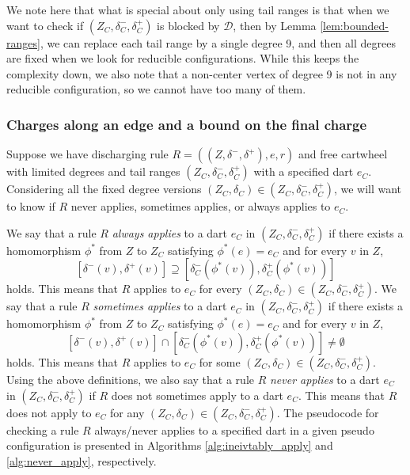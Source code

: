 \documentclass[10pt,a4paper]{article}
\def\cD{{\mathcal D}}
\newcommand\drop[1]{}
\begin{document}
We note here that what is special about only using tail ranges is that when we
want to check if  $(Z_C,\delta_C^-,\delta_C^+)$ is blocked by $\cD$, then by Lemma \ref{lem:bounded-ranges}, we can replace each tail range by a single degree 9, and then all degrees are fixed when we look for reducible configurations.
While this keeps the complexity down, we also note that a non-center vertex of degree 9 is not in any reducible configuration, so we cannot have too many of them.

\drop{Note that we can cut 
$(Z_C,\delta_C^-,\delta_C^+)$ from our output if we can guarantee that
no $(Z_C,\delta_C) \in (Z_C,\delta_C^-,\delta_C^+)$ is bad in the sense
of having non-negative final center charge and no centered reducible configuration from $\cD$.
Such a guarantee  typically requires us 
to limit the degree ranges to fixed degrees so that we rule out reducible configurations and better see which discharging rules apply.}




\newcommand{\cRnoD}{\mathcal{R}^{*-\mathcal{D}}\xspace}
\newcommand{\cartwheelRange}{(Z_C, \delta_C^-, \delta_C^+)\xspace}

\subsubsection{Charges along an edge and a bound on the final charge}
\label{sect:hom-to-ranges}

Suppose we have discharging rule $R = ((Z,\delta^-,\delta^+),e,r)$ and free cartwheel with limited degrees and tail ranges $(Z_C,\delta_C^-,\delta_C^+)$ with a specified dart $e_C$. Considering all
the fixed degree versions
$(Z_C,\delta_C) \in (Z_C,\delta_C^-,\delta_C^+)$, we will want to know if $R$ never applies, sometimes applies, or always applies to $e_C$.

We say that a rule $R$ \emph{always applies} to a dart $e_C$ in $\cartwheelRange$ if there exists a homomorphism $\phi^*$ from $Z$ to $Z_C$ satisfying $\phi^*(e)=e_C$ and for every $v$ in $Z$,
\[
[\delta^-(v), \delta^+(v)] \supseteq [\delta_C^{-}(\phi^*(v)), \delta_C^{+}(\phi^*(v))]
\]
holds.
This means that $R$ applies to $e_C$ for every $(Z_C,\delta_C) \in (Z_C, \delta_C^-, \delta_C^+)$.
We say that a rule $R$ \emph{sometimes applies} to a dart $e_C$ in $\cartwheelRange$ if there exists a homomorphism $\phi^*$ from $Z$ to $Z_C$ satisfying $\phi^*(e)=e_C$ and for every $v$ in $Z$,
\[
[\delta^-(v), \delta^+(v)] \cap [\delta_C^{-}(\phi^*(v)), \delta_C^{+}(\phi^*(v))] \neq \emptyset
\]
holds.
This means that $R$ applies to $e_C$ for some $(Z_C,\delta_C) \in (Z_C, \delta_C^-, \delta_C^+)$.
Using the above definitions, we also say that a rule $R$ \emph{never applies} to a dart $e_C$ in $\cartwheelRange$ if $R$ does not sometimes apply to a dart $e_C$.
This means that $R$ does not apply to $e_C$ for any $(Z_C,\delta_C) \in (Z_C, \delta_C^-, \delta_C^+)$.
The pseudocode for checking a rule $R$ always/never applies to a specified dart in a given pseudo configuration is presented in Algorithms \ref{alg:ineivtably_apply} and \ref{alg:never_apply}, respectively.
\end{document}

